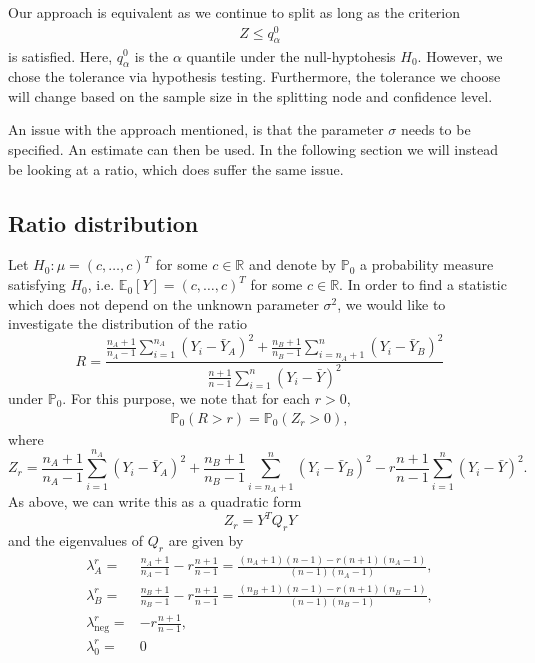 \documentclass{article}
\theoremstyle{definition}
\theoremstyle{remark}
\newcommand{\R}{\mathbb{R}}  %
\newcommand{\E }{\mathbb{E}}  %
\renewcommand{\P}{\mathbb{P}}  %
\begin{document}
Our approach is equivalent as we continue to split as long as
the criterion
\begin{align*}
	Z \leq q_\alpha ^0
\end{align*}
is satisfied. Here, $ q_\alpha^0 $ is the $ \alpha $ quantile under the
null-hyptohesis $ H_0 $. However, we chose the tolerance via hypothesis testing. Furthermore, the tolerance we choose will change based on the
sample size in the splitting node and confidence level.

An issue with the approach mentioned, is that the parameter $ \sigma $ needs to
be specified. An estimate can then be used. In the following section we will
instead be looking at a ratio, which does suffer the same issue.


\subsection{Ratio distribution}
Let $H_0 : \mu = (c, \dots, c)^T$ for some $c \in \R$ and denote by $\P_0$ a probability measure satisfying $H_0$, i.e. $\E_0[Y] = (c, \dots, c)^T$ for some $c \in \R$. In order to find a statistic which does not depend on the unknown parameter $\sigma^2$, we would like to investigate the distribution of the ratio
$$
	R = \frac{
		\frac{n_A + 1}{n_A - 1} \sum_{i=1}^{n_A} (Y_i - \bar Y_A)^2 + \frac{n_B + 1}{n_B - 1} \sum_{i= n_A + 1}^{n} (Y_i - \bar Y_B)^2
	}{
		\frac{n+1}{n -1} \sum_{i=1}^{n} (Y_i - \bar Y)^2
	}
$$
under $\P_0$. For this purpose, we note that for each $r > 0$,
\begin{align*}
	\P_0(R > r) = \P_0(Z_r > 0),
\end{align*}
where
$$
	Z_r = \frac{n_A + 1}{n_A - 1} \sum_{i=1}^{n_A} (Y_i - \bar Y_A)^2 + \frac{n_B + 1}{n_B - 1} \sum_{i= n_A + 1}^{n} (Y_i - \bar Y_B)^2 - r
	\frac{n+1}{n -1} \sum_{i=1}^{n} (Y_i - \bar Y)^2.
$$
As above, we can write this as a quadratic form
$$
	Z_r = Y^T Q_r Y
$$
and the eigenvalues of $Q_r$ are given by
\begin{align*}
	\lambda_A^r =            & \frac{n_A +1}{n_A -1} - r\frac{n+1}{n-1} = \frac{(n_A + 1)(n-1) - r(n+1)(n_A -1)}{(n-1)(n_A -1)}, \\
	\lambda_B^r =            & \frac{n_B +1}{n_B -1} - r\frac{n+1}{n-1} = \frac{(n_B + 1)(n-1) - r(n+1)(n_B -1)}{(n-1)(n_B -1)}, \\
	\lambda_{\text{neg}}^r = & -r\frac{n+1}{n-1},                                                                                \\
	\lambda_0^r =            & 0
\end{align*}
\end{document}
